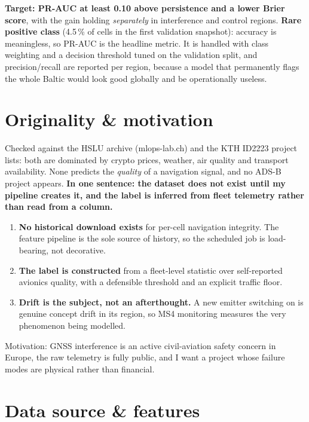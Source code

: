 \documentclass[10pt,a4paper]{article}
\begin{document}
\textbf{Target: PR-AUC at least 0.10 above persistence and a lower Brier score}, with the
gain holding \emph{separately} in interference and control regions. \textbf{Rare positive
class} (4.5\,\% of cells in the first validation snapshot): accuracy is meaningless, so
PR-AUC is the headline metric. It is handled with class weighting and a decision threshold
tuned on the validation split, and precision/recall are reported per region, because a model
that permanently flags the whole Baltic would look good globally and be operationally useless.

\section{Originality \& motivation}

Checked against the HSLU archive (mlops-lab.ch) and the KTH ID2223 project lists: both are
dominated by crypto prices, weather, air quality and transport availability. None predicts
the \emph{quality} of a navigation signal, and no ADS-B project appears.
\textbf{In one sentence: the dataset does not exist until my pipeline creates it, and the
label is inferred from fleet telemetry rather than read from a column.}

\begin{enumerate}
  \item \textbf{No historical download exists} for per-cell navigation integrity. The
        feature pipeline is the sole source of history, so the scheduled job is
        load-bearing, not decorative.
  \item \textbf{The label is constructed} from a fleet-level statistic over self-reported
        avionics quality, with a defensible threshold and an explicit traffic floor.
  \item \textbf{Drift is the subject, not an afterthought.} A new emitter switching on is
        genuine concept drift in its region, so MS4 monitoring measures the very
        phenomenon being modelled.
\end{enumerate}

Motivation: GNSS interference is an active civil-aviation safety concern in Europe, the
raw telemetry is fully public, and I want a project whose failure modes are physical
rather than financial.

\section{Data source \& features}
\end{document}
